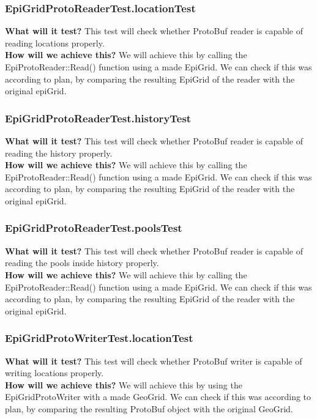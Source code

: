 \documentclass{article}
\begin{document}
\subsubsection{EpiGridProtoReaderTest.locationTest} 
\textbf{What will it test?} 
This test will check whether ProtoBuf reader is capable of reading locations properly. \\
\newline
\textbf{How will we achieve this?} 
We will achieve this by calling the EpiProtoReader::Read() function using a made EpiGrid. We can check if this was according to plan, by comparing the resulting EpiGrid of the reader with the original epiGrid.
\subsubsection{EpiGridProtoReaderTest.historyTest} 
\textbf{What will it test?} 
This test will check whether ProtoBuf reader is capable of reading the history properly. \\
\newline
\textbf{How will we achieve this?} 
We will achieve this by calling the EpiProtoReader::Read() function using a made EpiGrid. We can check if this was according to plan, by comparing the resulting EpiGrid of the reader with the original epiGrid.
\subsubsection{EpiGridProtoReaderTest.poolsTest} 
\textbf{What will it test?} 
This test will check whether ProtoBuf reader is capable of reading the pools inside history properly. \\
\newline
\textbf{How will we achieve this?} 
We will achieve this by calling the EpiProtoReader::Read() function using a made EpiGrid. We can check if this was according to plan, by comparing the resulting EpiGrid of the reader with the original epiGrid.
\subsubsection{EpiGridProtoWriterTest.locationTest} 
\textbf{What will it test?} 
This test will check whether ProtoBuf writer is capable of writing locations properly. \\
\newline
\textbf{How will we achieve this?} 
We will achieve this by using the EpiGridProtoWriter with a made GeoGrid. We can check if this was according to plan, by comparing the resulting ProtoBuf object with the original GeoGrid.
\end{document}
